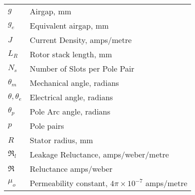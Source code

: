 \label{glossary}
\begin{singlespacing}
    \begin{longtable}{p{} p{}}
        $g$                & Airgap, mm                                              \\
        $g_e$              & Equivalent airgap, mm                                   \\
        $J$                & Current Density, amps/metre                             \\
        $L_R$              & Rotor stack length, mm                                  \\
        $N_s$              & Number of Slots per Pole Pair                           \\
        $\theta_m$         & Mechanical angle, radians                               \\
        $\theta, \theta_e$ & Electrical angle, radians                               \\
        $\theta_p$         & Pole Arc angle, radians                                 \\
        $p$                & Pole pairs                                              \\
        $R$                & Stator radius, mm                                       \\
        $\Re_l$            & Leakage Reluctance, amps/weber/metre                    \\
        $\Re$              & Reluctance amps/weber                                   \\
        $\mu_o$            & Permeability constant, $4\pi \times 10^{-7}$ amps/metre \\
    \end{longtable}
\end{singlespacing}

